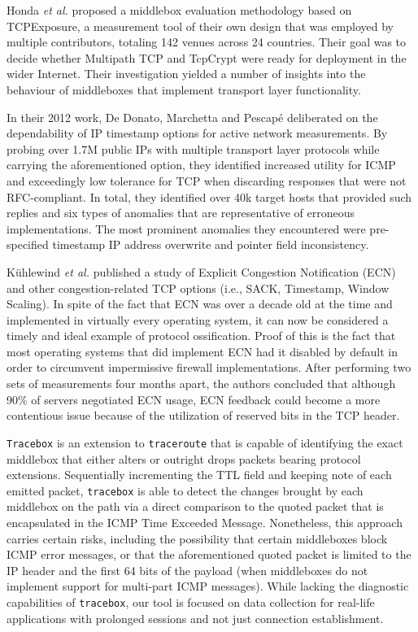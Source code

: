 Honda \textit{et al.} \cite{honda2011still} proposed a middlebox evaluation methodology based on TCPExposure, a measurement tool of their own design that was employed by multiple contributors, totaling 142 venues across 24 countries. Their goal was to decide whether Multipath TCP \cite{wischik2011design} and TcpCrypt \cite{bittau2010case} were ready for deployment in the wider Internet. Their investigation yielded a number of insights into the behaviour of middleboxes that implement transport layer functionality.

In their 2012 work, De Donato, Marchetta and Pescapé \cite{de2012hands} deliberated on the dependability of IP timestamp options for active network measurements. By probing over 1.7M public IPs with multiple transport layer protocols while carrying the aforementioned option, they identified increased utility for ICMP and exceedingly low tolerance for TCP when discarding responses that were not RFC-compliant. In total, they identified over 40k target hosts that provided such replies and six types of anomalies that are representative of erroneous implementations. The most prominent anomalies they encountered were pre-specified timestamp IP address overwrite and pointer field inconsistency.

Kühlewind \textit{et al.} \cite{kuhlewind2013state} published a study of Explicit Congestion Notification (ECN) and other congestion-related TCP options (i.e., SACK, Timestamp, Window Scaling). In spite of the fact that ECN was over a decade old at the time and implemented in virtually every operating system, it can now be considered a timely and ideal example of protocol ossification. Proof of this is the fact that most operating systems that did implement ECN had it disabled by default in order to circumvent impermissive firewall implementations. After performing two sets of measurements four months apart, the authors concluded that although 90\% of servers negotiated ECN usage, ECN feedback could become a more contentious issue because of the utilization of reserved bits in the TCP header.

\texttt{Tracebox} \cite{detal2013revealing} is an extension to \texttt{traceroute} that is capable of identifying the exact middlebox that either alters or outright drops packets bearing protocol extensions. Sequentially incrementing the TTL field and keeping note of each emitted packet, \texttt{tracebox} is able to detect the changes brought by each middlebox on the path via a direct comparison to the quoted packet that is encapsulated in the ICMP Time Exceeded Message. Nonetheless, this approach carries certain risks, including the possibility that certain middleboxes block ICMP error messages, or that the aforementioned quoted packet is limited to the IP header and the first 64 bits of the payload (when middleboxes do not implement support for multi-part ICMP messages). While lacking the diagnostic capabilities of \texttt{tracebox}, our tool is focused on data collection for real-life applications with prolonged sessions and not just connection establishment.

